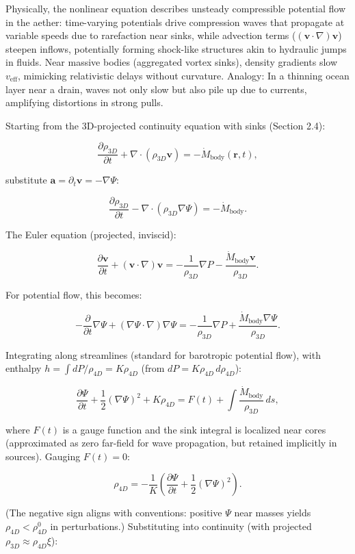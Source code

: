 Physically, the nonlinear equation describes unsteady compressible potential flow in the aether: time-varying potentials drive compression waves that propagate at variable speeds due to rarefaction near sinks, while advection terms ($( \mathbf{v} \cdot \nabla ) \mathbf{v}$) steepen inflows, potentially forming shock-like structures akin to hydraulic jumps in fluids. Near massive bodies (aggregated vortex sinks), density gradients slow $v_{\text{eff}}$, mimicking relativistic delays without curvature. Analogy: In a thinning ocean layer near a drain, waves not only slow but also pile up due to currents, amplifying distortions in strong pulls.

Starting from the 3D-projected continuity equation with sinks (Section 2.4):

\[
\frac{\partial \rho_{3D}}{\partial t} + \nabla \cdot (\rho_{3D} \mathbf{v}) = -\dot{M}_{\text{body}}(\mathbf{r}, t),
\]

substitute $\mathbf{a} = \partial_t \mathbf{v} = -\nabla \Psi$:

\[
\frac{\partial \rho_{3D}}{\partial t} - \nabla \cdot (\rho_{3D} \nabla \Psi) = -\dot{M}_{\text{body}}.
\]

The Euler equation (projected, inviscid):

\[
\frac{\partial \mathbf{v}}{\partial t} + (\mathbf{v} \cdot \nabla) \mathbf{v} = -\frac{1}{\rho_{3D}} \nabla P - \frac{\dot{M}_{\text{body}} \mathbf{v}}{\rho_{3D}}.
\]

For potential flow, this becomes:

\[
-\frac{\partial}{\partial t} \nabla \Psi + (\nabla \Psi \cdot \nabla) \nabla \Psi = -\frac{1}{\rho_{3D}} \nabla P + \frac{\dot{M}_{\text{body}} \nabla \Psi}{\rho_{3D}}.
\]

Integrating along streamlines (standard for barotropic potential flow), with enthalpy $h = \int dP / \rho_{4D} = K \rho_{4D}$ (from $dP = K \rho_{4D} \, d\rho_{4D}$):

\[
\frac{\partial \Psi}{\partial t} + \frac{1}{2} (\nabla \Psi)^2 + K \rho_{4D} = F(t) + \int \frac{\dot{M}_{\text{body}}}{\rho_{3D}} \, ds,
\]

where $F(t)$ is a gauge function and the sink integral is localized near cores (approximated as zero far-field for wave propagation, but retained implicitly in sources). Gauging $F(t) = 0$:

\[
\rho_{4D} = -\frac{1}{K} \left( \frac{\partial \Psi}{\partial t} + \frac{1}{2} (\nabla \Psi)^2 \right).
\]

(The negative sign aligns with conventions: positive $\Psi$ near masses yields $\rho_{4D} < \rho_{4D}^0$ in perturbations.) Substituting into continuity (with projected $\rho_{3D} \approx \rho_{4D} \xi$):

